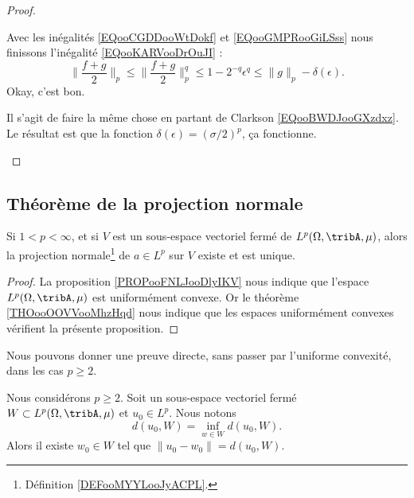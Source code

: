 \begin{proof}
\begin{subproof}
        Avec les inégalités \eqref{EQooCGDDooWtDokf} et \ref{EQooGMPRooGiLSss} nous finissons l'inégalité \eqref{EQooKARVooDrOuJI} :
        \begin{equation}
            \| \frac{ f+g }{2} \|_p\leq \| \frac{ f+g }{2} \|_p^q\leq 1-2^{-q}\epsilon^q\leq \| g \|_p-\delta(\epsilon).
        \end{equation}
        Okay, c'est bon.

        Il s'agit de faire la même chose en partant de Clarkson \eqref{EQooBWDJooGXzdxz}. Le résultat est que la fonction \( \delta(\epsilon)=(\sigma/2)^p\), ça fonctionne.
    \end{subproof}
\end{proof}

\subsection{Théorème de la projection normale}

\begin{proposition}     \label{PROPooTZMRooCvQtGg}
    Si \( 1<p<\infty\), et si \( V\) est un sous-espace vectoriel fermé de \( L^p(\Omega,\tribA, \mu)\), alors la projection normale\footnote{Définition \ref{DEFooMYYLooJyACPL}.} de \( a\in L^p\) sur \( V\) existe et est unique.
\end{proposition}

\begin{proof}
    La proposition \ref{PROPooFNLJooDlyIKV} nous indique que l'espace \( L^p(\Omega,\tribA, \mu)\) est uniformément convexe. Or le théorème \ref{THOooOOVVooMhzHqd} nous indique que les espaces uniformément convexes vérifient la présente proposition.
\end{proof}

Nous pouvons donner une preuve directe, sans passer par l'uniforme convexité, dans les cas \( p\geq 2\).
\begin{theorem} \label{THOooRJFUooQivDKm}
    Nous considérons \( p\geq 2\). Soit un sous-espace vectoriel fermé \( W\subset L^p(\Omega,\tribA,\mu)\) et \( u_0\in L^p\). Nous notons
    \begin{equation}
        d(u_0,W)=\inf_{w\in W}d(u_0,W).
    \end{equation}
    Alors il existe \( w_0\in W\) tel que \( \| u_0-w_0 \|=d(u_0,W)\).
\end{theorem}

